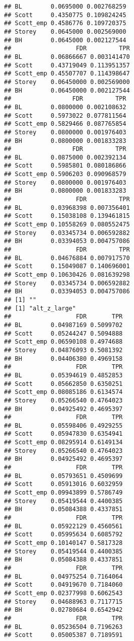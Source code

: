 \documentclass{article}\usepackage[]{graphicx}\usepackage[]{color}
\makeatletter
\newenvironment{kframe}{%
 \def\at@end@of@kframe{}%
 \ifinner\ifhmode%
  \def\at@end@of@kframe{\end{minipage}}%
  \begin{minipage}{\columnwidth}%
 \fi\fi%
 \def\FrameCommand##1{\hskip\@totalleftmargin \hskip-\fboxsep
 \colorbox{shadecolor}{##1}\hskip-\fboxsep
     \hskip-\linewidth \hskip-\@totalleftmargin \hskip\columnwidth}%
 \MakeFramed {\advance\hsize-\width
   \@totalleftmargin\z@ \linewidth\hsize
   \@setminipage}}%
 {\par\unskip\endMakeFramed%
 \at@end@of@kframe}
\newenvironment{knitrout}{}{} %
\makeatother
\begin{document}
\begin{knitrout}
\begin{kframe}
\begin{verbatim}
## BL        0.0695000 0.002768259
## Scott     0.4350775 0.109824245
## Scott_emp 0.4586776 0.109720375
## Storey    0.0645000 0.002569000
## BH        0.0645000 0.002127544
##                  FDR         TPR
## BL        0.06866667 0.003141470
## Scott     0.43719049 0.113951357
## Scott_emp 0.45507707 0.114398647
## Storey    0.06450000 0.002569000
## BH        0.06450000 0.002127544
##                 FDR         TPR
## BL        0.0800000 0.002108632
## Scott     0.5973022 0.077811564
## Scott_emp 0.5829466 0.087765854
## Storey    0.0800000 0.001976403
## BH        0.0800000 0.001833283
##                 FDR         TPR
## BL        0.0875000 0.002392134
## Scott     0.5985801 0.080186866
## Scott_emp 0.5906203 0.090968579
## Storey    0.0800000 0.001976403
## BH        0.0800000 0.001833283
##                  FDR         TPR
## BL        0.03968398 0.007356401
## Scott     0.15038108 0.139461815
## Scott_emp 0.10558269 0.080552475
## Storey    0.03345734 0.006592882
## BH        0.03394053 0.004757086
##                  FDR         TPR
## BL        0.04676884 0.007917570
## Scott     0.15049087 0.140696001
## Scott_emp 0.10630426 0.081639298
## Storey    0.03345734 0.006592882
## BH        0.03394053 0.004757086
## [1] ""
## [1] "alt_z_large"
##                  FDR       TPR
## BL        0.04987169 0.5099702
## Scott     0.05244247 0.5094888
## Scott_emp 0.06590108 0.4974688
## Storey    0.04876093 0.5081392
## BH        0.04406380 0.4969158
##                  FDR       TPR
## BL        0.05394619 0.4852853
## Scott     0.05662850 0.6350251
## Scott_emp 0.08085186 0.6134574
## Storey    0.05266540 0.4764023
## BH        0.04925492 0.4695397
##                  FDR       TPR
## BL        0.05598406 0.4929255
## Scott     0.05947830 0.6354941
## Scott_emp 0.08295914 0.6149134
## Storey    0.05266540 0.4764023
## BH        0.04925492 0.4695397
##                  FDR       TPR
## BL        0.05793651 0.4509699
## Scott     0.05913016 0.6032959
## Scott_emp 0.09943899 0.5786749
## Storey    0.05419544 0.4400385
## BH        0.05084388 0.4337851
##                  FDR       TPR
## BL        0.05922129 0.4560561
## Scott     0.05995634 0.6085792
## Scott_emp 0.10140147 0.5817328
## Storey    0.05419544 0.4400385
## BH        0.05084388 0.4337851
##                  FDR       TPR
## BL        0.04975254 0.7164064
## Scott     0.04919670 0.7184060
## Scott_emp 0.02377998 0.6062543
## Storey    0.04688963 0.7117715
## BH        0.02780684 0.6542942
##                  FDR       TPR
## BL        0.05236504 0.7196263
## Scott     0.05005387 0.7189591

\end{verbatim}
\end{kframe}
\end{knitrout}
\end{document}
